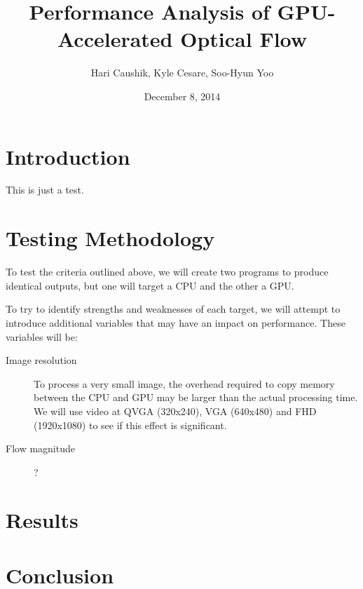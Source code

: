 \documentclass{article}
\title{Performance Analysis of GPU-Accelerated Optical Flow}
\date{December 8, 2014}
\author{Hari Caushik, Kyle Cesare, Soo-Hyun Yoo}
\begin{document}
\maketitle

\newpage

\tableofcontents

\newpage

\section{Introduction}
This is just a test.

\section{Testing Methodology}
To test the criteria outlined above, we will create two programs to produce
identical outputs, but one will target a CPU and the other a GPU.

To try to identify strengths and weaknesses of each target, we will attempt to
introduce additional variables that may have an impact on performance. These
variables will be:

\begin{description}
  \item[Image resolution] To process a very small image, the overhead required
    to copy memory between the CPU and GPU may be larger than the actual
    processing time. We will use video at QVGA (320x240), VGA (640x480) and FHD
    (1920x1080) to see if this effect is significant.
  \item[Flow magnitude] ?
\end{description}

\section{Results}

\section{Conclusion}
\end{document}
